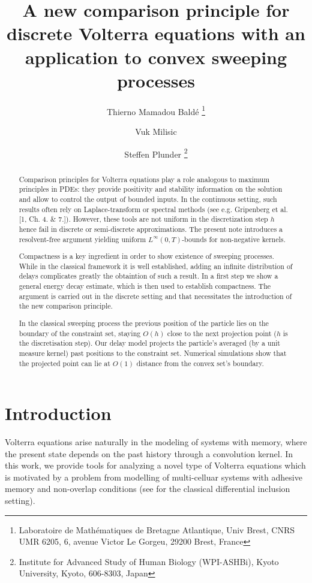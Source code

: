 \documentclass[]{jnsao}
\title{A new comparison principle for discrete Volterra equations with an application to convex sweeping processes}
\author{Thierno Mamadou Baldé \thanks{Laboratoire de Mathématiques de Bretagne Atlantique,
Univ Brest, CNRS UMR 6205,
6, avenue Victor Le Gorgeu,
29200 Brest, France}
\and Vuk Milisic \footnotemark[1]
\and Steffen Plunder \thanks{Institute for Advanced Study of Human Biology (WPI-ASHBi), Kyoto University, Kyoto, 606-8303, Japan}
}
\begin{document}
\maketitle

\begin{abstract}
Comparison principles for Volterra equations play a role analogous to maximum principles in PDEs: 
they provide positivity and stability information on the solution and allow to control 
the output of bounded inputs. In the continuous setting, such results often rely on Laplace-transform 
or spectral methods (see e.g. Gripenberg et al. [1, Ch. 4. \& 7.]). However, these tools are not 
uniform in the discretization step  $h$ hence fail in discrete or semi-discrete approximations. 
The present note introduces a resolvent-free argument yielding uniform $L^\infty(0,T)$-bounds
for non-negative kernels.

Compactness is a key ingredient in order to show existence of sweeping processes.
While in the classical framework it is well established, adding an infinite 
distribution of delays complicates greatly the obtaintion of such a result.
In a first step we show a general energy decay estimate, which is then used to
establish compactness. The argument is carried out in the discrete setting
and that necessitates the introduction of the  new comparison principle.

In the classical sweeping process the previous position of the particle
lies on the boundary of the constraint set, staying $O(h)$
close to the next projection point ($h$ is the discretisation step). Our delay model projects the particle's
averaged (by a unit measure kernel) past positions  to the constraint set.
Numerical simulations show that the projected point can lie at $O(1)$
distance from the convex set's boundary.
\end{abstract}


\tableofcontents

\section{Introduction}

Volterra equations arise naturally in the modeling of systems with memory, where the present state depends
on the past history through a convolution kernel. In this work, we provide tools for analyzing a novel type of Volterra 
equations which is motivated by a problem from modelling of multi-celluar systems with adhesive memory and non-overlap 
conditions (see \cite{venel08} for the classical differential inclusion setting). 
\end{document}
